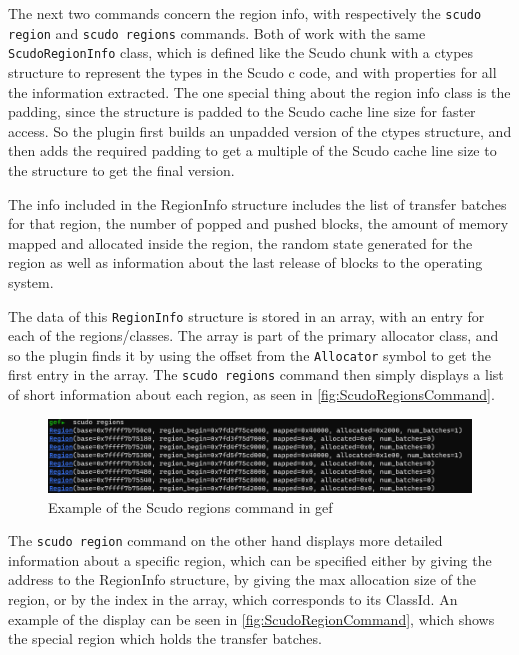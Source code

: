 \documentclass[a4paper,11pt,oneside]{report}
\begin{document}
The next two commands concern the region info, with respectively the
\verb|scudo region| and \verb|scudo regions| commands. Both of work with the same
\verb|ScudoRegionInfo| class, which is defined like the Scudo chunk with a ctypes
structure to represent the types in the Scudo c code, and with properties for
all the information extracted. The one special thing about the region info
class is the padding, since the structure is padded to the Scudo cache line
size for faster access. So the plugin first builds an unpadded version of the
ctypes structure, and then adds the required padding to get a multiple of the
Scudo cache line size to the structure to get the final version.

The info included in the RegionInfo structure includes the list of transfer
batches for that region, the number of popped and pushed blocks, the amount
of memory mapped and allocated inside the region, the random state generated
for the region as well as information about the last release of blocks to
the operating system.

The data of this \verb|RegionInfo| structure is stored in an array, with an entry
for each of the regions/classes. The array is part of the primary allocator
class, and so the plugin finds it by using the offset from the \verb|Allocator|
symbol to get the first entry in the array.
The \verb|scudo regions| command then simply displays a list of short information
about each region, as seen in \autoref{fig:ScudoRegionsCommand}.

\begin{figure}[h!]
  \centering
  \includegraphics[width=\linewidth]{figures/ScudoRegionsCommand.png}
  \caption{Example of the Scudo regions command in gef}
  \label{fig:ScudoRegionsCommand}
\end{figure}

The \verb|scudo region| command on the other hand displays more detailed information
about a specific region, which can be specified either by giving the address
to the RegionInfo structure, by giving the max allocation size of the region,
or by the index in the array, which corresponds to its ClassId. An example of
the display can be seen in \autoref{fig:ScudoRegionCommand}, which shows the
special region which holds the transfer batches.
\end{document}
